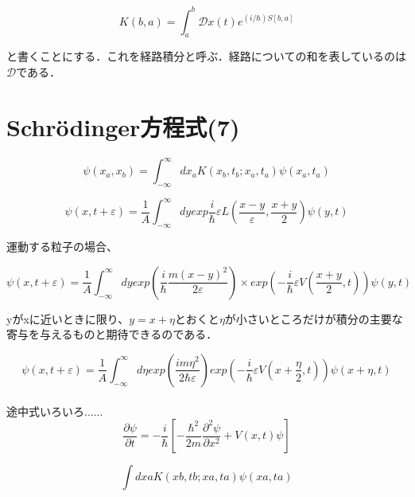 \documentclass[xelatex,ja=standard,jafont=noto]{bxjsarticle}
\begin{document}
\begin{equation}
    K(b,a)=\int_{a}^{b}\mathcal{D}x(t)e^{(i/\hbar)S[b,a]}
\end{equation}

と書くことにする．これを経路積分と呼ぶ．経路についての和を表しているのは$\mathcal{D}$である．

\newpage

\section{Schrödinger方程式(7)}

\begin{equation}
    \psi(x_{a},x_{b})=\int_{-\infty}^{\infty}dx_{a}K(x_{b},t_{b};x_{a},t_{a})\psi(x_{a},t_{a})
\end{equation}

\begin{equation}
    \psi(x,t+\varepsilon)=\frac{1}{A}\int_{-\infty}^{\infty}dy exp{\frac{i}{\hbar}\varepsilon L(\frac{x-y}{\varepsilon},\frac{x+y}{2})}\psi(y,t)
\end{equation}

運動する粒子の場合、

\begin{equation}
    \psi(x,t+\varepsilon)=\frac{1}{A}\int_{-\infty}^{\infty}dy exp(\frac{i}{\hbar}\frac{m(x-y)^{2}}{2\varepsilon})\times exp(-\frac{i}{\hbar}\varepsilon V(\frac{x+y}{2},t))\psi(y,t)
\end{equation}


yがxに近いときに限り、$y=x+\eta$とおくと$\eta$が小さいところだけが積分の主要な寄与を与えるものと期待できるのである．

\begin{equation}
    \psi(x,t+\varepsilon)=\frac{1}{A}\int_{-\infty}^{\infty}d\eta exp(\frac{im\eta^{2}}{2\hbar\varepsilon})exp(-\frac{i}{\hbar}\varepsilon V(x+\frac{\eta}{2},t))\psi(x+\eta,t)
\end{equation}\\

途中式いろいろ......\\

\begin{equation}
    \frac{\partial\psi}{\partial t}=-\frac{i}{\hbar}[-\frac{\hbar^{2}}{2m}\frac{\partial^{2}\psi}{\partial x^{2}}+V(x,t)\psi]
\end{equation}

\newpage

\begin{equation}
    \int dxa K(xb,tb;xa,ta)\psi(xa,ta)
\end{equation}
\end{document}
